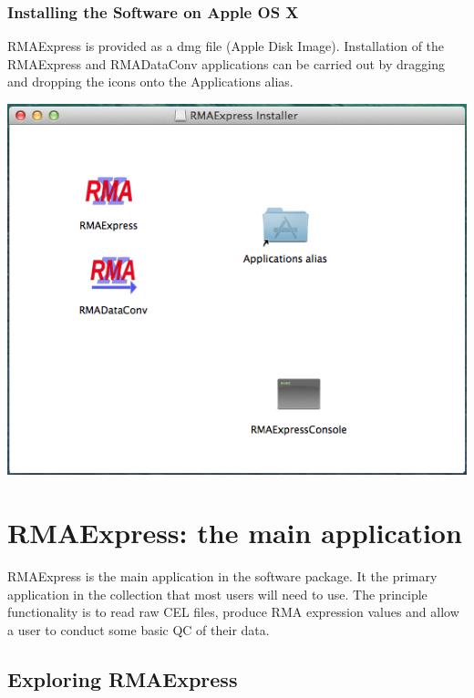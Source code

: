 \documentclass[11pt]{report}
\begin{document}
\subsection{Installing the Software on Apple OS X}

RMAExpress is provided as a dmg file (Apple Disk Image). Installation of the RMAExpress and RMADataConv applications can be carried out by dragging and dropping the icons onto the Applications alias.

\begin{center}
\includegraphics[scale=0.5]{MacOSX_InstallerWindow}
\end{center}

\chapter{RMAExpress: the main application} \label{chap:RMAExpress}

RMAExpress is the main application in the software package. It the primary application in the collection that most users will need to use. The principle functionality is to read raw CEL files, produce RMA expression values and allow a user to conduct some basic QC of their data. 

\section{Exploring RMAExpress}
\end{document}
